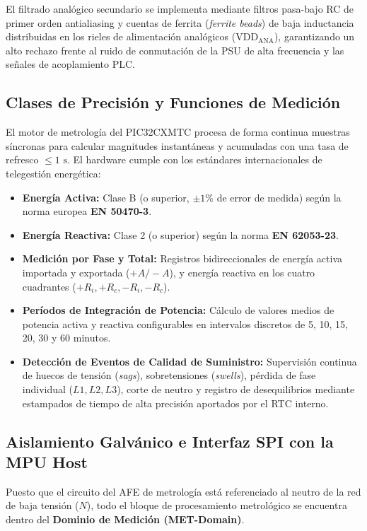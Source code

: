 El filtrado analógico secundario se implementa mediante filtros pasa-bajo RC de primer orden antialiasing y cuentas de ferrita (\textit{ferrite beads}) de baja inductancia distribuidas en los rieles de alimentación analógicos ($\text{VDD}_{\text{ANA}}$), garantizando un alto rechazo frente al ruido de conmutación de la PSU de alta frecuencia y las señales de acoplamiento PLC.

\subsection{Clases de Precisión y Funciones de Medición}
\label{subsec:clases_precision_mediciones}

El motor de metrología del PIC32CXMTC procesa de forma continua muestras síncronas para calcular magnitudes instantáneas y acumuladas con una tasa de refresco $\le 1\text{ s}$. El hardware cumple con los estándares internacionales de telegestión energética:
\begin{itemize}
    \item \textbf{Energía Activa:} Clase B (o superior, $\pm 1\%$ de error de medida) según la norma europea \textbf{EN 50470-3}.
    \item \textbf{Energía Reactiva:} Clase 2 (o superior) según la norma \textbf{EN 62053-23}.
    \item \textbf{Medición por Fase y Total:} Registros bidireccionales de energía activa importada y exportada ($+A / -A$), y energía reactiva en los cuatro cuadrantes ($+R_i, +R_c, -R_i, -R_c$).
    \item \textbf{Períodos de Integración de Potencia:} Cálculo de valores medios de potencia activa y reactiva configurables en intervalos discretos de 5, 10, 15, 20, 30 y 60 minutos.
    \item \textbf{Detección de Eventos de Calidad de Suministro:} Supervisión continua de huecos de tensión (\textit{sags}), sobretensiones (\textit{swells}), pérdida de fase individual ($L1, L2, L3$), corte de neutro y registro de desequilibrios mediante estampados de tiempo de alta precisión aportados por el RTC interno.
\end{itemize}

\subsection{Aislamiento Galvánico e Interfaz SPI con la MPU Host}
\label{subsec:aislamiento_metrologia_cpu}

Puesto que el circuito del AFE de metrología está referenciado al neutro de la red de baja tensión ($N$), todo el bloque de procesamiento metrológico se encuentra dentro del \textbf{Dominio de Medición (MET-Domain)}. 

